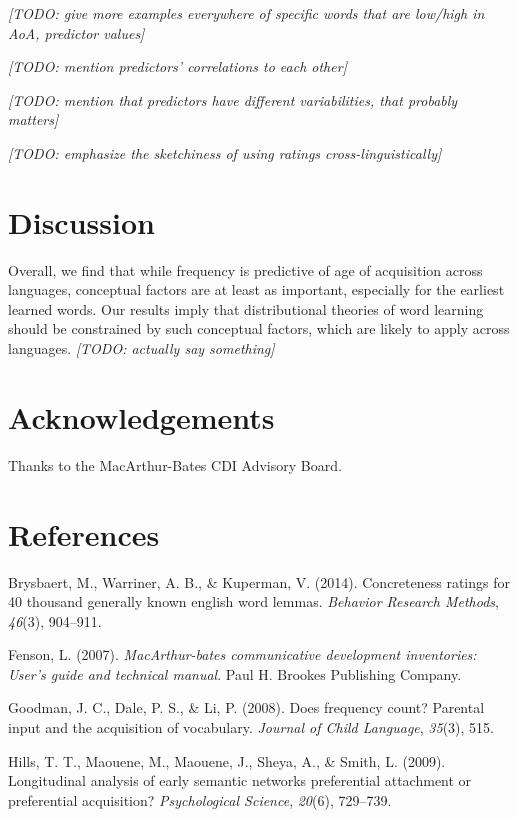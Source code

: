 \documentclass[10pt, letterpaper]{article}
\begin{document}
\emph{{[}TODO: give more examples everywhere of specific words that are
low/high in AoA, predictor values{]}}

\emph{{[}TODO: mention predictors' correlations to each other{]}}

\emph{{[}TODO: mention that predictors have different variabilities,
that probably matters{]}}

\emph{{[}TODO: emphasize the sketchiness of using ratings
cross-linguistically{]}}

\newpage

\section{Discussion}\label{discussion}

Overall, we find that while frequency is predictive of age of
acquisition across languages, conceptual factors are at least as
important, especially for the earliest learned words. Our results imply
that distributional theories of word learning should be constrained by
such conceptual factors, which are likely to apply across languages.
\emph{{[}TODO: actually say something{]}}

\section{Acknowledgements}\label{acknowledgements}

Thanks to the MacArthur-Bates CDI Advisory Board.

\section{References}\label{references}

\setlength{\parindent}{-0.1in} \setlength{\leftskip}{0.125in} \noindent

Brysbaert, M., Warriner, A. B., \& Kuperman, V. (2014). Concreteness
ratings for 40 thousand generally known english word lemmas.
\emph{Behavior Research Methods}, \emph{46}(3), 904--911.

Fenson, L. (2007). \emph{MacArthur-bates communicative development
inventories: User's guide and technical manual}. Paul H. Brookes
Publishing Company.

Goodman, J. C., Dale, P. S., \& Li, P. (2008). Does frequency count?
Parental input and the acquisition of vocabulary. \emph{Journal of Child
Language}, \emph{35}(3), 515.

Hills, T. T., Maouene, M., Maouene, J., Sheya, A., \& Smith, L. (2009).
Longitudinal analysis of early semantic networks preferential attachment
or preferential acquisition? \emph{Psychological Science}, \emph{20}(6),
729--739.
\end{document}
